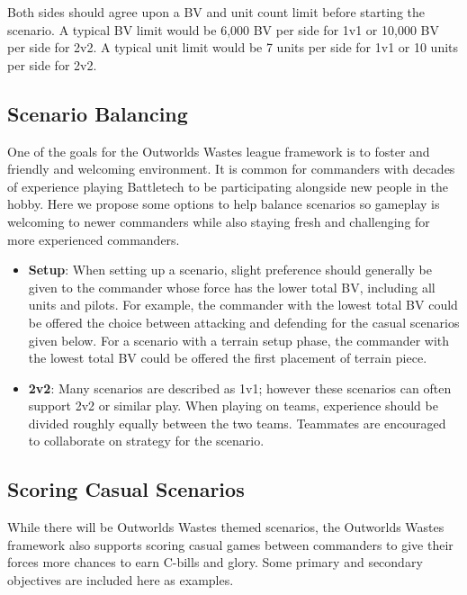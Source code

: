 \documentclass[UTF8]{article}
\begin{document}
Both sides should agree upon a BV and unit count limit before starting the scenario.
A typical BV limit would be 6,000 BV per side for 1v1 or 10,000 BV per side for 2v2.
A typical unit limit would be 7 units per side for 1v1 or 10 units per side for 2v2.\\

\subsection{Scenario Balancing}

One of the goals for the Outworlds Wastes league framework is to foster and friendly and welcoming environment.
It is common for commanders with decades of experience playing Battletech to be participating alongside new people in the hobby.
Here we propose some options to help balance scenarios so gameplay is welcoming to newer commanders while also staying fresh and challenging for more experienced commanders.\\

\begin{itemize}

\item {\bf Setup}: When setting up a scenario, slight preference should generally be given to the commander whose force has the lower total BV, including all units and pilots.
For example, the commander with the lowest total BV could be offered the choice between attacking and defending for the casual scenarios given below.
For a scenario with a terrain setup phase, the commander with the lowest total BV could be offered the first placement of terrain piece.

\item {\bf 2v2}: Many scenarios are described as 1v1; however these scenarios can often support 2v2 or similar play.
When playing on teams, experience should be divided roughly equally between the two teams.
Teammates are encouraged to collaborate on strategy for the scenario.

\end{itemize}

\subsection{Scoring Casual Scenarios}

While there will be Outworlds Wastes themed scenarios, the Outworlds Wastes framework also supports scoring casual games between commanders to give their forces more chances to earn C-bills and glory.
Some primary and secondary objectives are included here as examples.\\
\end{document}
